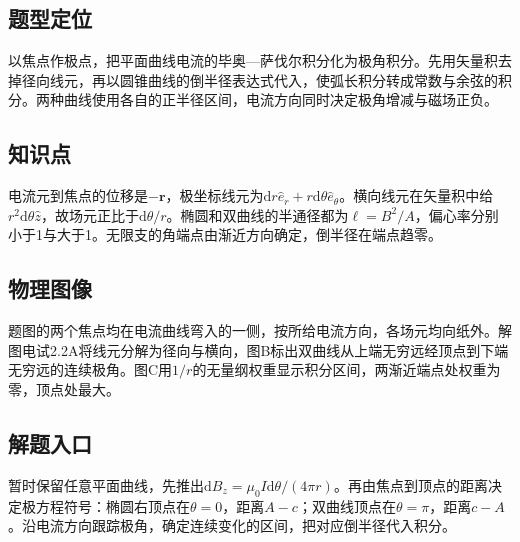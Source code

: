 \documentclass[UTF8,fontset=fandol,a4paper,11pt]{ctexart}
\begin{document}


\subsection*{题型定位}

以焦点作极点，把平面曲线电流的毕奥—萨伐尔积分化为极角积分。先用矢量积去掉径向线元，再以圆锥曲线的倒半径表达式代入，使弧长积分转成常数与余弦的积分。两种曲线使用各自的正半径区间，电流方向同时决定极角增减与磁场正负。



\subsection*{知识点}

电流元到焦点的位移是$-\boldsymbol r$，极坐标线元为$\mathrm dr\hat e_r+r\mathrm d\theta\hat e_\theta$。横向线元在矢量积中给$r^2\mathrm d\theta\hat z$，故场元正比于$\mathrm d\theta/r$。椭圆和双曲线的半通径都为$\ell=B^2/A$，偏心率分别小于1与大于1。无限支的角端点由渐近方向确定，倒半径在端点趋零。



\subsection*{物理图像}

题图的两个焦点均在电流曲线弯入的一侧，按所给电流方向，各场元均向纸外。解图电试2.2A将线元分解为径向与横向，图B标出双曲线从上端无穷远经顶点到下端无穷远的连续极角。图C用$1/r$的无量纲权重显示积分区间，两渐近端点处权重为零，顶点处最大。



\subsection*{解题入口}

暂时保留任意平面曲线，先推出$\mathrm dB_z=\mu_0I\mathrm d\theta/(4\pi r)$。再由焦点到顶点的距离决定极方程符号：椭圆右顶点在$\theta=0$，距离$A-c$；双曲线顶点在$\theta=\pi$，距离$c-A$。沿电流方向跟踪极角，确定连续变化的区间，把对应倒半径代入积分。
\end{document}
